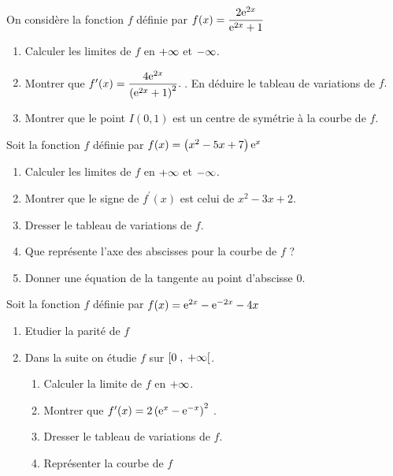  \begin{exercice}

 On considère la fonction $ f $ définie par $ f(x)=\dfrac{2\mathrm{e}^{2x}}{\mathrm{e}^{2x}+1} $
 \begin{enumerate}
 \item Calculer  les limites de $ f $  en $+\infty $ et $ -\infty$.
 \item Montrer que $ f^{\prime} (x)=\dfrac{4\mathrm{e}^{2x}}{\left(\mathrm{e}^{2x}+1\right)^{2}}.\:$.\; En  déduire le tableau de variations de $ f. $
 \item Montrer que le point $I(0,1)$ est un centre de symétrie à la courbe de $ f. $
 \end{enumerate}
  \end{exercice}



 \begin{exercice}
Soit la fonction $ f $ définie par $ f(x)=\left(x^{2}-5x+7\right)\mathrm{e}^{x} $
 \begin{enumerate}
 \item Calculer  les limites de $ f $  en $+\infty $ et $ -\infty$.
 \item Montrer que  le signe de  $ f^{\prime} (x)$  est celui de $ x^{2}-3x+2 $.
 \item Dresser le tableau de variations de $ f. $
 \item Que représente l'axe des abscisses pour la courbe de $ f $  ?
 \item Donner une équation de la tangente au point d'abscisse 0.
 \end{enumerate}
  \end{exercice}
  
  \begin{exercice}
Soit la fonction $ f $ définie par $ f(x)=\mathrm{e}^{2x}-\mathrm{e}^{-2x}-4x $
\begin{enumerate}
 \item Etudier la parité de $ f $
 \item
 Dans la suite on étudie $ f $  sur $ \left[0 \;,\; +\infty\right[ $.
 \begin{enumerate}
 \item Calculer  la limite de $ f $  en $+\infty $.
 \item Montrer que   $ f^{\prime} (x)=2\left(\mathrm{e}^{x}-\mathrm{e}^{-x}\right)^{2}$ .
 \item Dresser le tableau de variations de $ f. $
 \item Représenter la courbe de $ f $  
 
 \end{enumerate}
  \end{enumerate}
  \end{exercice}
  

